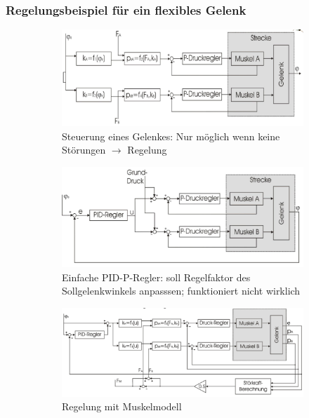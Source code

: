 \subsubsection{Regelungsbeispiel für ein flexibles Gelenk}
\begin{figure}[h!]
	\centering
	\begin{subfigure}{.5\textwidth}
		\includegraphics[width=\linewidth]{figures/ch03_gelenksteuerung.png}
		\caption{Steuerung eines Gelenkes: Nur möglich wenn keine Störungen $\rightarrow$ Regelung}
	\end{subfigure}
	\begin{subfigure}{.5\textwidth}
		\includegraphics[width=\linewidth]{figures/ch03_gelenkregelung.png}
		\caption{Einfache PID-P-Regler: soll Regelfaktor des Sollgelenkwinkels anpasssen; funktioniert nicht wirklich}
	\end{subfigure}
	\begin{subfigure}{.5\textwidth}
		\includegraphics[width=\linewidth]{figures/ch03_gelenkregelung1.png}
		\caption{Regelung mit Muskelmodell}
		\label{rmm}
	\end{subfigure}
	\caption{}
	\label{gbsp}
\end{figure}
